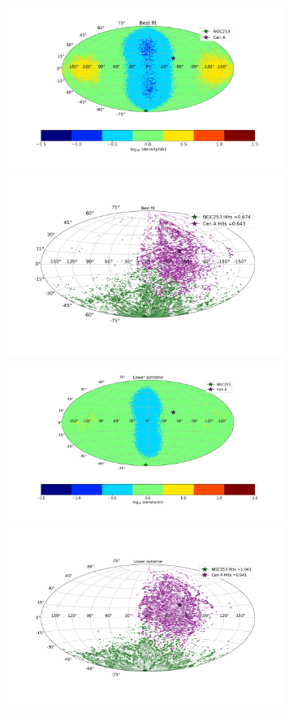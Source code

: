 \documentclass[12pt, a4 paper]{article}
\begin{document}
\begin{figure}[h!]
\includegraphics[width=9.0cm]{Images/Log_Bins_180_Historgam_BF_N2_Str_Tur_TM_40_EeV.png}
\includegraphics[width=9.0cm]{Images/Bins_180_BF_N2_CenA_NGC253_Str_Tur_TM_40_EeV.png}
\includegraphics[width=9.0cm]{Images/Log_Bins_180_Historgam_LB_N2_Str_Tur_TM_40_EeV.png}
\includegraphics[width=9.0cm]{Images/Bins_180_LB_N2_CenA_NGC253_Str_Tur_TM_40_EeV.png}

\end{figure}
\end{document}
